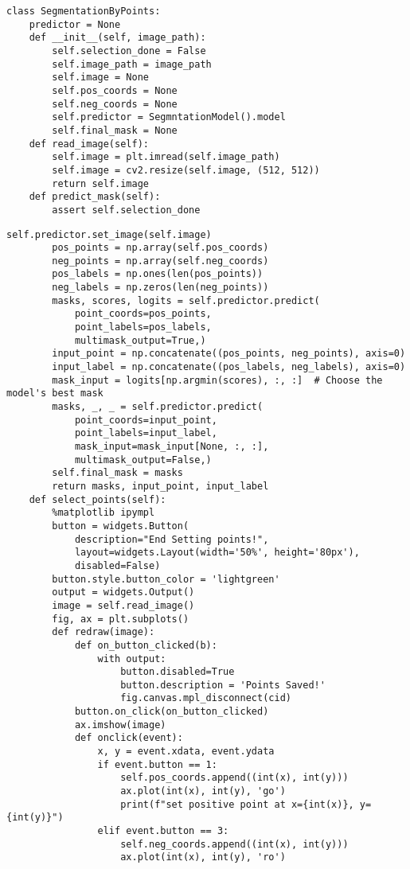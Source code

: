 \begin{lstlisting}[basicstyle=\ttfamily\small]
class SegmentationByPoints:
    predictor = None
    def __init__(self, image_path):
        self.selection_done = False
        self.image_path = image_path
        self.image = None
        self.pos_coords = None
        self.neg_coords = None
        self.predictor = SegmntationModel().model
        self.final_mask = None
    def read_image(self):
        self.image = plt.imread(self.image_path)
        self.image = cv2.resize(self.image, (512, 512))
        return self.image
    def predict_mask(self):
        assert self.selection_done
                \end{lstlisting}
\begin{lstlisting}[basicstyle=\ttfamily\small]
        self.predictor.set_image(self.image)
        pos_points = np.array(self.pos_coords)
        neg_points = np.array(self.neg_coords)
        pos_labels = np.ones(len(pos_points))
        neg_labels = np.zeros(len(neg_points))
        masks, scores, logits = self.predictor.predict(
            point_coords=pos_points,
            point_labels=pos_labels,
            multimask_output=True,)
        input_point = np.concatenate((pos_points, neg_points), axis=0)
        input_label = np.concatenate((pos_labels, neg_labels), axis=0)
        mask_input = logits[np.argmin(scores), :, :]  # Choose the model's best mask
        masks, _, _ = self.predictor.predict(
            point_coords=input_point,
            point_labels=input_label,
            mask_input=mask_input[None, :, :],
            multimask_output=False,)
        self.final_mask = masks
        return masks, input_point, input_label
    def select_points(self):
        %matplotlib ipympl
        button = widgets.Button(
            description="End Setting points!",
            layout=widgets.Layout(width='50%', height='80px'),
            disabled=False)
        button.style.button_color = 'lightgreen'
        output = widgets.Output()
        image = self.read_image()
        fig, ax = plt.subplots()
        def redraw(image):
            def on_button_clicked(b):
                with output:
                    button.disabled=True
                    button.description = 'Points Saved!'
                    fig.canvas.mpl_disconnect(cid)
            button.on_click(on_button_clicked)
            ax.imshow(image)
            def onclick(event):
                x, y = event.xdata, event.ydata
                if event.button == 1:
                    self.pos_coords.append((int(x), int(y)))
                    ax.plot(int(x), int(y), 'go')
                    print(f"set positive point at x={int(x)}, y={int(y)}")
                elif event.button == 3:
                    self.neg_coords.append((int(x), int(y)))
                    ax.plot(int(x), int(y), 'ro')
                    \end{lstlisting}
